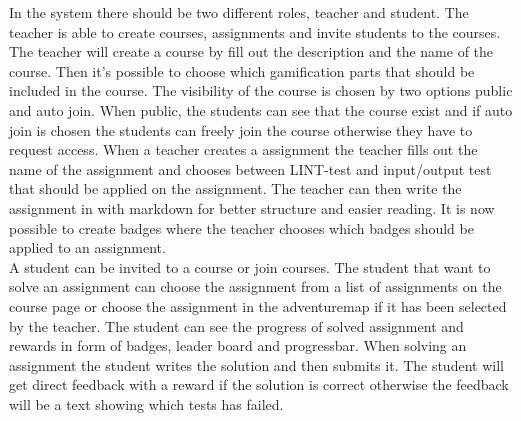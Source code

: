 In the system there should be two different roles, teacher and student.
The teacher is able to create courses, assignments and invite students to the courses.
The teacher will create a course by fill out the description and the name of the course. Then it's possible to choose which gamification parts that should be included in the course. The visibility of the course is chosen by two options public and auto join. When public, the students can see that the course exist and if auto join is chosen the students can freely join the course otherwise they have to request access. When a teacher creates a assignment the teacher fills out the name of the assignment and chooses between LINT-test and input/output test that should be applied on the assignment. The teacher can then write the assignment in with markdown for better structure and easier reading. It is now possible to create badges where the teacher chooses which badges should be applied to an assignment.\\

A student can be invited to a course or join courses. The student that want to solve an assignment can choose the assignment from a list of assignments on the course page or choose the assignment in the adventuremap if it has been selected by the teacher. The student can see the progress of solved assignment and rewards in form of badges, leader board and progressbar. When solving an assignment the student writes the solution and then submits it. The student will get direct feedback with a reward if the solution is correct otherwise the feedback will be a text showing which tests has failed.
